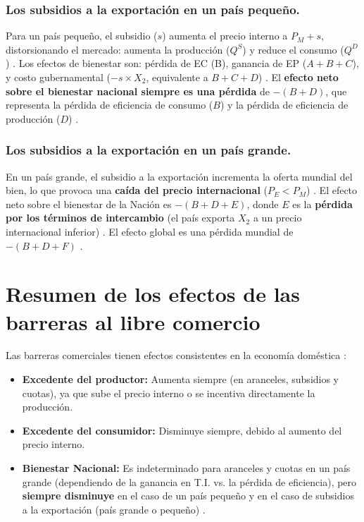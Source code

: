 \subsubsection{Los subsidios a la exportación en un país pequeño.}
Para un país pequeño, el subsidio ($s$) aumenta el precio interno a $P_M + s$, distorsionando el mercado: aumenta la producción ($Q^S$) y reduce el consumo ($Q^D$) . Los efectos de bienestar son: pérdida de EC (B), ganancia de EP ($A+B+C$), y costo gubernamental ($-s \times X_2$, equivalente a $B+C+D$) . El \textbf{efecto neto sobre el bienestar nacional siempre es una pérdida} de $-(B+D)$, que representa la pérdida de eficiencia de consumo ($B$) y la pérdida de eficiencia de producción ($D$) .

\subsubsection{Los subsidios a la exportación en un país grande.}
En un país grande, el subsidio a la exportación incrementa la oferta mundial del bien, lo que provoca una \textbf{caída del precio internacional} ($P_E < P_M$) . El efecto neto sobre el bienestar de la Nación es $-(B+D+E)$, donde $E$ es la \textbf{pérdida por los términos de intercambio} (el país exporta $X_2$ a un precio internacional inferior) . El efecto global es una pérdida mundial de $-(B+D+F)$ .

\section{Resumen de los efectos de las barreras al libre comercio}
Las barreras comerciales tienen efectos consistentes en la economía doméstica :
\begin{itemize}
    \item \textbf{Excedente del productor:} Aumenta siempre (en aranceles, subsidios y cuotas), ya que sube el precio interno o se incentiva directamente la producción.
    \item \textbf{Excedente del consumidor:} Disminuye siempre, debido al aumento del precio interno.
    \item \textbf{Bienestar Nacional:} Es indeterminado para aranceles y cuotas en un país grande (dependiendo de la ganancia en T.I. vs. la pérdida de eficiencia), pero \textbf{siempre disminuye} en el caso de un país pequeño y en el caso de subsidios a la exportación (país grande o pequeño) .
\end{itemize}

